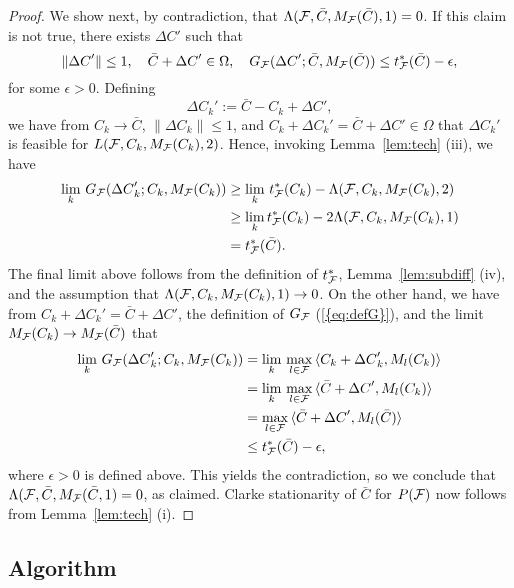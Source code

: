 \documentclass{siamltex}
\begin{document}
\begin{proof}
  We show next, by contradiction, that
  $\Lambda({{\cal F}},\bar{C},M_{{\cal F}}(\bar{C}),1)=0$.  If this claim is not
  true, there exists ${\Delta C}'$ such that
\[
\| {\Delta C}' \| \le 1, \quad
\bar{C}+{\Delta C}' \in \Omega, \quad
G_{{\cal F}}({\Delta C}';\bar{C},M_{{\cal F}}(\bar{C})) \le t^*_{{\cal F}}(\bar{C}) - \epsilon,
\]
for some $\epsilon>0$. Defining
\[
{\Delta C}_k' := \bar{C} - C_k + {\Delta C}',
\]
we have from $C_k \to \bar{C}$, $\| {\Delta C}_k \| \le 1$, and $C_k + {\Delta C}_k'
= \bar{C} + {\Delta C}' \in \Omega$ that ${\Delta C}_k'$ is feasible for
$L({{\cal F}},C_k,M_{{\cal F}}(C_k),2)$. Hence, invoking Lemma~\ref{lem:tech}
(iii), we have
\begin{align*}
\lim_k \, G_{{\cal F}}({\Delta C}_k';C_k,M_{{\cal F}}(C_k)) & \ge
\lim_k \, t^*_{{\cal F}}(C_k) - \Lambda({{\cal F}},C_k,M_{{\cal F}}(C_k),2) \\
& \ge 
\lim_k t^*_{{\cal F}}(C_k) - 2 \Lambda({{\cal F}},C_k,M_{{\cal F}}(C_k),1)  \\
& = t^*_{{\cal F}}(\bar{C}).
\end{align*}
The final limit above follows from the definition of $t^*_{{\cal F}}$,
Lemma~\ref{lem:subdiff} (iv), and the assumption that
$\Lambda({{\cal F}},C_k,M_{{\cal F}}(C_k),1) \to 0$.  On the other hand, we have
from $C_k + {\Delta C}_k' = \bar{C} + {\Delta C}'$, the definition of $G_{{\cal F}}$
{(\ref{{eq:defG}})}, and the limit $M_{{\cal F}}(C_k) \to M_{{\cal F}}(\bar{C})$
that
\begin{align*}
\lim_k \, G_{{\cal F}}({\Delta C}_k';C_k,M_{{\cal F}}(C_k)) 
& = \lim_k \, \max_{l \in {{\cal F}}} \, \langle C_k+{\Delta C}_k',M_l(C_k) \rangle \\
&= \lim_k \, \max_{l \in {{\cal F}}} \, \langle \bar{C}+{\Delta C}',M_l(C_k) \rangle \\
&=  \max_{l \in {{\cal F}}} \, \langle \bar{C}+{\Delta C}',M_l(\bar{C}) \rangle \\
& \le
t^*_{{\cal F}}(\bar{C})-\epsilon,
\end{align*}
where $\epsilon>0$ is defined above.  This yields the contradiction,
so we conclude that $\Lambda({{\cal F}},\bar{C},M_{{\cal F}}(\bar{C},1)=0$, as
claimed. Clarke stationarity of $\bar{C}$ for $P({{\cal F}})$ now follows
from Lemma~\ref{lem:tech} (i).
\end{proof}

\subsection{Algorithm} \label{sec:alg}
\end{document}
